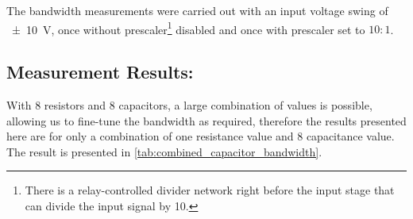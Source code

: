 The bandwidth measurements were carried out with an input voltage swing of
\SI{\pm10}{\volt}, once without prescaler\footnote{There is a relay-controlled divider network right before the input
stage that can divide the input signal by 10.} disabled and once with prescaler
set to $10:1$.

\subsection*{Measurement Results:}
With 8 resistors and 8 capacitors, a large combination of values is possible,
allowing us to fine-tune the bandwidth as required, therefore the results
presented here are for only a combination of one resistance value and 8
capacitance value.
The result is presented in \autoref{tab:combined_capacitor_bandwidth}.

\begin{table}[h!]
    \centering
    \caption[PreAmplifier Compensation Network Measurement]{
        Comparison of effect of changing capacitor values inthe compensation network of the pre amplifier.
    }
    \label{tab:combined_capacitor_bandwidth}
\end{table}

